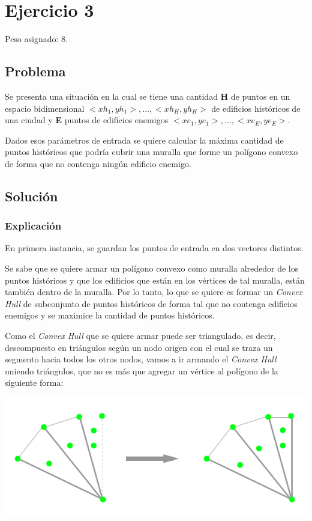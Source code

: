 \section{Ejercicio 3}

Peso asignado: 8.

\subsection{Problema}

Se presenta una situación en la cual se tiene una cantidad \textbf{H} de puntos en un espacio bidimensional
$<xh_1,yh_1>,...,<xh_H,yh_H>$ de edificios históricos de una ciudad y \textbf{E} puntos de edificios
enemigos $<xe_1,ye_1>,...,<xe_E,ye_E>$.

Dados esos parámetros de entrada se quiere calcular la máxima cantidad de puntos históricos que podría cubrir
una muralla que forme un polígono convexo de forma que no contenga ningún edificio enemigo.

\subsection{Solución}

\subsubsection{Explicación}

En primera instancia, se guardan los puntos de entrada en dos vectores distintos.

Se sabe que se quiere armar un polígono convexo como muralla alrededor de los puntos históricos y que los
edificios que están en los vértices de tal muralla, están también dentro de la muralla. Por lo tanto, lo
que se quiere es formar un \textit{Convex Hull} de subconjunto de puntos históricos de forma tal que no
contenga edificios enemigos y se maximice la cantidad de puntos históricos.

Como el \textit{Convex Hull} que se quiere armar puede ser triangulado, es decir, descompuesto en triángulos
según un nodo origen con el cual se traza un segmento hacia todos los otros nodos, vamos a ir armando el
\textit{Convex Hull} uniendo triángulos, que no es más que agregar un vértice al polígono de la siguiente forma:

\includegraphics[scale=0.5]{img/ej31.png}

